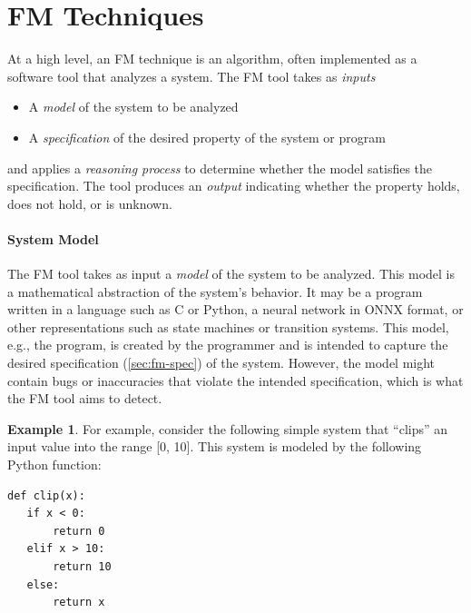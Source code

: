 \documentclass[oneside,11pt,dvipsnames]{book}
\numberwithin{equation}{section}
\theoremstyle{definition}
\newtheorem{example}{Example}[section]
\theoremstyle{remark}
\begin{document}
\section{FM Techniques}

At a high level, an FM technique is an algorithm, often implemented as a software tool that analyzes a system.  The FM tool takes as \emph{inputs}
\begin{itemize}
    \item A \emph{model} of the system to be analyzed
    \item A \emph{specification} of the desired property of the system or program
\end{itemize}
and applies a \emph{reasoning process} to determine whether the model satisfies the specification. The tool produces an \emph{output} indicating whether the property holds, does not hold, or is unknown.

\paragraph{System Model}
The FM tool takes as input a \emph{model} of the system to be analyzed. This model is a mathematical abstraction of the system's behavior. It may be a program written in a language such as C or Python, a neural network in ONNX format, or other representations such as state machines or transition systems. This model, e.g., the program, is created by the programmer and is intended to capture the desired specification (\autoref{sec:fm-spec}) of the system.  However, the model might contain bugs or inaccuracies that violate the intended specification, which is what the FM tool aims to detect.


\begin{example}\label{ex:clip}
For example, consider the following simple system that ``clips'' an input value into the range [0, 10]. This system is modeled by the following Python function:

\begin{lstlisting}
def clip(x):
   if x < 0:
       return 0
   elif x > 10:
       return 10
   else:
       return x    
\end{lstlisting}
\end{example}
\end{document}
